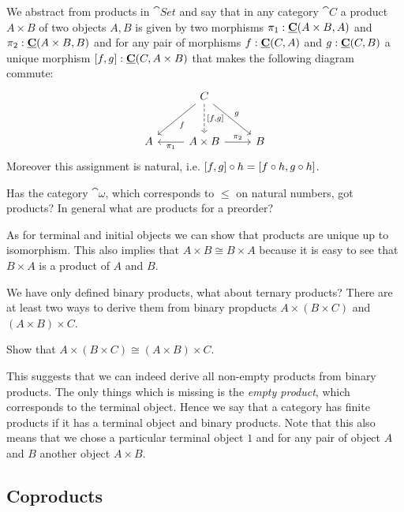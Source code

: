 We abstract from products in $\cat{Set}$ and say that in any category $\cat{C}$ a product $A \times B$ of two objects $A,B$ is given by two morphisms $\pi_1 : \underline{\mathbf{C}}(A\times B,A)$ and $\pi_2 : \underline{\mathbf{C}}(A\times B,B)$ and for any pair of morphisms $f:\underline{\mathbf{C}}(C,A)$ and 
$g : \underline{\mathbf{C}}(C,B)$ a unique morphism $[f,g] : \underline{\mathbf{C}}(C,A \times B)$ that makes the following diagram commute:
\[\begin{tikzcd}[row sep = large]
& C \arrow[dl,"f"] \arrow[d, dashrightarrow,"\pair{f}{g}"] \arrow[dr,"g"]\\
A & A \times B \arrow[r,"\pi_2"] \arrow[l,"\pi_1"]& B
\end{tikzcd}\]
Moreover this assignment is natural, i.e. $[f,g] \circ h = [f\circ h,g\circ h]$.

\begin{question}
  Has the category $\cat{\omega}$, which corresponds to $\leq$ on natural numbers, got products? In general what are products for a preorder?
\end{question}

As for terminal and initial objects we can show that products are unique up to isomorphism. This also implies that  $A\times B \cong B \times A$ because it is easy to see that $B\times A$ is a product of $A$ and $B$.

We have only defined binary products, what about ternary products? There are at least two ways to derive them from binary propducts $A \times (B\times C)$ and $(A\times B)\times C$. 
\begin{Exercise}
  Show that $A \times (B\times C) \cong (A\times B)\times C$. 
\end{Exercise}

This suggests that we can indeed derive all non-empty products from binary products. The only things which is missing is the \emph{empty product}, which corresponds to the terminal object. Hence we say that a category has finite products if it has a terminal object and binary products. Note that this also means that we chose a particular terminal object $1$ and for any pair of object $A$ and $B$ another object $A\times B$.

\subsection{Coproducts}
\label{sec:coproducts}

